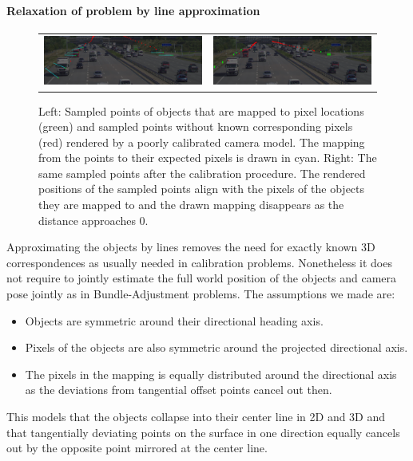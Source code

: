\paragraph{Relaxation of problem by line approximation}
\label{sec:static_calibration_line_approximation}
\begin{figure}[!ht]
  \centering
  \begin{tabular}{cc}
    \includegraphics[width=0.4\linewidth]{images/calibration/background_uncalibrated_with_mapping.png}    &  
    \includegraphics[width=0.4\linewidth]{images/calibration/background_calibrated.png}    
  \end{tabular}
  \caption{Left: Sampled points of objects that are mapped to pixel locations (green) and sampled points without known corresponding pixels (red) rendered by a poorly calibrated camera model.
  The mapping from the points to their expected pixels is drawn in cyan.
  Right: The same sampled points after the calibration procedure.
  The rendered positions of the sampled points align with the pixels of the objects they are mapped to and the drawn mapping disappears as the distance approaches $0$.  }
  \label{fig:calibration}
  \end{figure}
Approximating the objects by lines removes the need for exactly known 3D correspondences as usually needed in calibration problems. 
Nonetheless it does not require to jointly estimate the full world position of the objects and camera pose jointly as in Bundle-Adjustment problems.
%
The assumptions we made are: 
\begin{itemize}
  \item Objects are symmetric around their directional heading axis.
  \item Pixels of the objects are also symmetric around the projected directional axis.
  \item The pixels in the mapping is equally distributed around the directional axis as the deviations from tangential offset points cancel out then. 
\end{itemize}

This models that the objects collapse into their center line in 2D and 3D and that tangentially deviating points on the surface in one direction equally cancels out by the opposite point mirrored at the center line.

